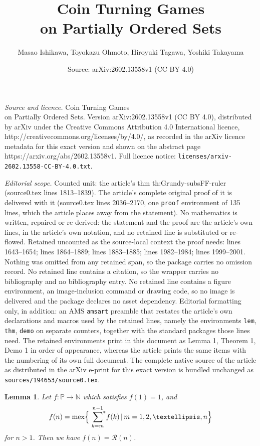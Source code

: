 \documentclass[10pt,a4paper]{amsart}
\title{Coin Turning Games \\on Partially Ordered Sets}
\author{Masao Ishikawa, Toyokazu Ohmoto, Hiroyuki Tagawa, Yoshiki Takayama}
\date{Source: arXiv:2602.13558v1 (CC BY 4.0)}
\newtheorem{lem}{Lemma}
\def\Non{\mathbb{N}}
\def\Pos{\mathbb{P}}
\def\fnh#1{\mathscr{R}\left({#1}\right)}
\newcommand{\mex}{\operatorname{mex}}
\newcommand{\nimsum}{{\sum}^{*}}
\begin{document}
\maketitle

\noindent\emph{Source and licence.} Coin Turning Games \\on Partially Ordered Sets. Version arXiv:2602.13558v1 (CC BY 4.0), distributed by arXiv under the Creative Commons Attribution 4.0 International licence, http://creativecommons.org/licenses/by/4.0/, as recorded in the arXiv licence metadata for this exact version and shown on the abstract page https://arxiv.org/abs/2602.13558v1. Full licence notice: \texttt{licenses/arxiv-2602.13558-CC-BY-4.0.txt}.\par\smallskip

\noindent\textit{Editorial scope.} Counted unit: the article's thm th:Grundy-subsFF-ruler (source0.tex lines 1813--1839). The article's complete original proof of it is delivered with it (source0.tex lines 2036--2170, one \texttt{proof} environment of 135 lines, which the article places away from the statement). No mathematics is written, repaired or re-derived: the statement and the proof are the article's own lines, in the article's own notation, and no retained line is substituted or re-flowed.  Retained uncounted as the source-local context the proof needs: lines 1643--1654; lines 1864--1889; lines 1883--1885; lines 1982--1984; lines 1999--2001.  Nothing was omitted from any retained span, so the package carries no omission record.  No retained line contains a citation, so the wrapper carries no bibliography and no bibliography entry.  No retained line contains a figure environment, an image-inclusion command or drawing code, so no image is delivered and the package declares no asset dependency.  Editorial formatting only, in addition: an AMS \texttt{amsart} preamble that restates the article's own declarations and macros used by the retained lines, namely the environments \texttt{lem}, \texttt{thm}, \texttt{demo} on separate counters, together with the standard packages those lines need.  The retained environments print in this document as Lemma 1, Theorem 1, Demo 1 in order of appearance, whereas the article prints the same items with the numbering of its own full document.  The complete native source of the article as distributed in the arXiv e-print for this exact version is bundled unchanged as \texttt{sources/194653/source0.tex}.
\begin{lem}\label{lem:chain-ruler-recurrence}
%
Let $f:\Pos\to\Non$ which satisfies $f(1)=1$, and
%
\begin{equation}\label{eq:chain-ruler-recurrence}
f(n)=\mex\Bigl\{\overset{n-1}{\underset{k=m}{\,\,\,\nimsum}}f(k) \,|\, m=1,2,\dots,n\Bigr\}
\end{equation}
%
for $n>1$.
Then we have $f(n)=\fnh{n}$.
%
\end{lem}
\end{document}
